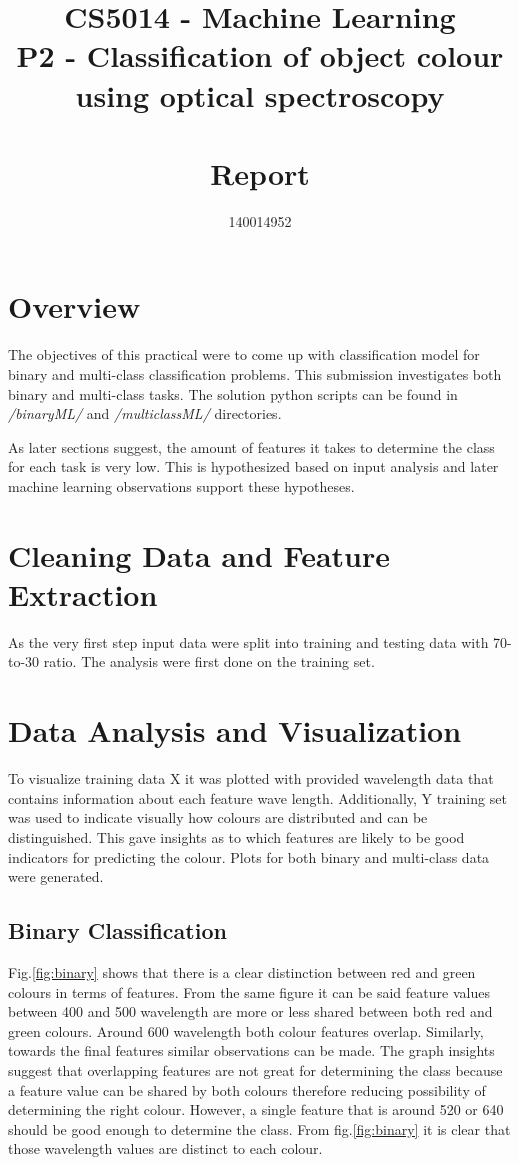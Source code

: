 \documentclass[11pt]{article}
\title{CS5014 - Machine Learning 
\\ \vspace{5mm} \Large P2 - Classification of object colour 
\\ using optical spectroscopy 
\\~\\ Report}
\author{140014952}
\begin{document}
	\maketitle

	\section{Overview}
		The objectives of this practical were to come up with classification model for binary and multi-class classification problems. This submission investigates both binary and multi-class tasks. The solution python scripts can be found in \textit{/binaryML/} and \textit{/multiclassML/} directories. 

		As later sections suggest, the amount of features it takes to determine the class for each task is very low. This is hypothesized based on input analysis and later machine learning observations support these hypotheses. 

	\section{Cleaning Data and Feature Extraction}
		As the very first step input data were split into training and testing data with 70-to-30 ratio. The analysis were first done on the training set. 
	\section{Data Analysis and Visualization}

		To visualize training data X it was plotted with provided wavelength data that contains information about each feature wave length. Additionally, Y training set was used to indicate visually how colours are distributed and can be distinguished. This gave insights as to which features are likely to be good indicators for predicting the colour. Plots for both binary and multi-class data were generated. 

		\subsection{Binary Classification}
			Fig.\ref{fig:binary} shows that there is a clear distinction between red and green colours in terms of features. From the same figure it can be said feature values between 400 and 500 wavelength are more or less shared between both red and green colours. Around 600 wavelength both colour features overlap. Similarly, towards the final features similar observations can be made. The graph insights suggest that overlapping features are not great for determining the class because a feature value can be shared by both colours therefore reducing possibility of determining the right colour. However, a single feature that is around 520 or 640 should be good enough to determine the class. From fig.\ref{fig:binary} it is clear that those wavelength values are distinct to each colour.
\end{document}
